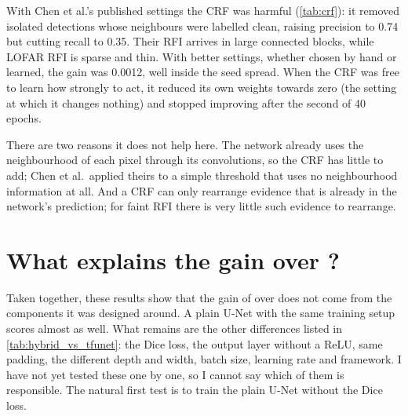 With Chen et al.'s published settings the CRF was harmful
(\cref{tab:crf}): it removed isolated detections whose neighbours were labelled
clean, raising precision to 0.74 but cutting recall to 0.35. Their RFI arrives
in large connected blocks, while LOFAR RFI is sparse and thin. With better
settings, whether chosen by hand or learned, the gain was 0.0012, well inside
the seed spread. When the CRF was free to learn how strongly to act, it reduced
its own weights towards zero (the setting at which it changes nothing) and
stopped improving after the second of 40 epochs.

There are two reasons it does not help here. The network already uses the
neighbourhood of each pixel through its convolutions, so the CRF has little to
add; Chen et al.\ applied theirs to a simple threshold that uses no
neighbourhood information at all. And a CRF can only rearrange evidence that is
already in the network's prediction; for faint RFI there is very little such
evidence to rearrange.

\section{What explains the gain over \tfunet{}?}
\label{sec:unexplained}
Taken together, these results show that the gain of \hybrid{} over \tfunet{}
does not come from the components it was designed around. A plain U-Net with
the same training setup scores almost as well. What remains are the other
differences listed in \cref{tab:hybrid_vs_tfunet}: the Dice loss, the output
layer without a ReLU, same padding, the different depth and width, batch size,
learning rate and framework. I have not yet tested these one by one, so I
cannot say which of them is responsible. The natural first test is to train
the plain U-Net without the Dice loss.
